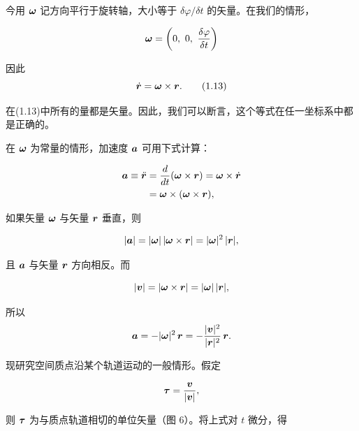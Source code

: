 今用 $\bm{\omega}$ 记方向平行于旋转轴，大小等于 $\delta\varphi / \delta t$ 的矢量。在我们的情形，

\begin{equation*}
\ve{\omega} = \left(0,\ 0,\ \frac{\delta\varphi}{\delta t}\right)
\end{equation*}

因此
\begin{equation}
\dot{\bm{r}} = \bm{\omega} \times \bm{r}.
\tag{1.13}
\end{equation}

在(1.13)中所有的量都是矢量。因此，我们可以断言，这个等式在任一坐标系中都是正确的。

在 $\bm{\omega}$ 为常量的情形，加速度 $\bm{a}$ 可用下式计算：

\begin{equation*}
\begin{aligned}
\bm{a} \equiv \ddot{\bm{r}} &= \frac{d}{dt}(\bm{\omega} \times \bm{r}) = \bm{\omega} \times \dot{\bm{r}}\\
&= \bm{\omega} \times (\bm{\omega} \times \bm{r}),
\end{aligned}
\end{equation*}

如果矢量 $\bm{\omega}$ 与矢量 $\bm{r}$ 垂直，则

\begin{equation*}
|\bm{a}| = |\bm{\omega}|\,|\bm{\omega} \times \bm{r}| = |\bm{\omega}|^{2}\,|\bm{r}|,
\end{equation*}

且 $\bm{a}$ 与矢量 $\bm{r}$ 方向相反。而

\begin{equation*}
|\bm{v}| = |\bm{\omega} \times \bm{r}| = |\bm{\omega}|\,|\bm{r}|,
\end{equation*}

所以
\begin{equation*}
\bm{a} = -|\bm{\omega}|^{2}\,\bm{r} = -\frac{|\bm{v}|^{2}}{|\bm{r}|^{2}}\,\bm{r}.
\end{equation*}

现研究空间质点沿某个轨道运动的一般情形。假定

\begin{equation*}
\bm{\tau} = \frac{\bm{v}}{|\bm{v}|},
\end{equation*}

则 $\bm{\tau}$ 为与质点轨道相切的单位矢量（图 6）。将上式对 $t$ 微分，得

